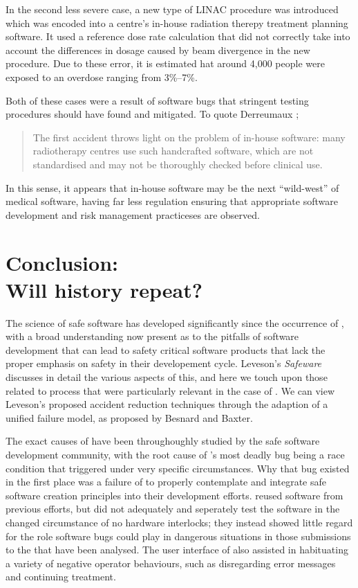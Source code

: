\documentclass{cshonours}
\begin{document}
In the second less severe case, a new type of LINAC procedure was introduced which was encoded into a centre's in-house radiation therepy treatment planning software. It used a reference dose rate calculation that did not correctly take into account the differences in dosage caused by beam divergence in the new procedure. Due to these error, it is estimated hat around 4,000 people were exposed to an overdose ranging from 3\%--7\%.

Both of these cases were a result of software bugs that stringent testing procedures should have found and mitigated. To quote Derreumaux \etal;
\begin{quote}
The first accident throws light on the problem of in-house software: many radiotherapy centres use such handcrafted software, which are not standardised and may not be thoroughly checked before clinical use. \cite{derreumaux2008lessons}
\end{quote}

In this sense, it appears that in-house software may be the next ``wild-west'' of medical software, having far less regulation ensuring that appropriate software development and risk management practiceses are observed. 



\chapter{Conclusion:\\Will history repeat?}
\label{chap:conclusion}
The science of safe software has developed significantly since the occurrence of \ther, with a broad understanding now present as to the pitfalls of software development that can lead to safety critical software products that lack the proper emphasis on safety in their developement cycle. Leveson's \textit{Safeware} discusses in detail the various aspects of this, and here we touch upon those related to process that were particularly relevant in the case of \ther. We can view Leveson's proposed accident reduction techniques through the adaption of a unified failure model, as proposed by Besnard and Baxter.

The exact causes of \ther have been throughoughly studied by the safe software development community, with the root cause of \ther's most deadly bug being a race condition that triggered under very specific circumstances. Why that bug existed in the first place was a failure of \aecl to properly contemplate and integrate safe software creation principles into their development efforts. \aecl reused software from previous efforts, but did not adequately and seperately test the software in the changed circumstance of no hardware interlocks; they instead showed little regard for the role software bugs could play in dangerous situations in those submissions to the \fda that have been analysed. The user interface of \ther also assisted in habituating a variety of negative operator behaviours, such as disregarding error messages and continuing treatment.
\end{document}
